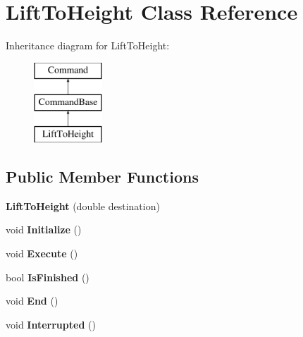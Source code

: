 \hypertarget{class_lift_to_height}{}\section{Lift\+To\+Height Class Reference}
\label{class_lift_to_height}
Inheritance diagram for Lift\+To\+Height\+:\begin{figure}[H]
\begin{center}
\leavevmode
\includegraphics[height=3.000000cm]{class_lift_to_height}
\end{center}
\end{figure}
\subsection*{Public Member Functions}
\begin{DoxyCompactItemize}
\item 
\hypertarget{class_lift_to_height_a01719b438cfc92034741ba204c2ec148}{}{\bfseries Lift\+To\+Height} (double destination)\label{class_lift_to_height_a01719b438cfc92034741ba204c2ec148}

\item 
\hypertarget{class_lift_to_height_a5e78ada1bae3a233eb50d53f0c44adc3}{}void {\bfseries Initialize} ()\label{class_lift_to_height_a5e78ada1bae3a233eb50d53f0c44adc3}

\item 
\hypertarget{class_lift_to_height_a935b281ef6f1bdf0380d9d8df411bd8c}{}void {\bfseries Execute} ()\label{class_lift_to_height_a935b281ef6f1bdf0380d9d8df411bd8c}

\item 
\hypertarget{class_lift_to_height_a0b085aa59453eae9ce4b60271898b1bb}{}bool {\bfseries Is\+Finished} ()\label{class_lift_to_height_a0b085aa59453eae9ce4b60271898b1bb}

\item 
\hypertarget{class_lift_to_height_a1fc76589065de2d7e5df828017fd6e9a}{}void {\bfseries End} ()\label{class_lift_to_height_a1fc76589065de2d7e5df828017fd6e9a}

\item 
\hypertarget{class_lift_to_height_ab967b5415131d8532ee72b23492f7eca}{}void {\bfseries Interrupted} ()\label{class_lift_to_height_ab967b5415131d8532ee72b23492f7eca}

\end{DoxyCompactItemize}
